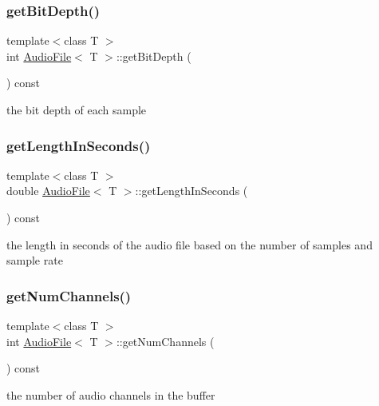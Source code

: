 \subsubsection{\texorpdfstring{get\+Bit\+Depth()}{getBitDepth()}}
{\footnotesize\ttfamily template$<$class T $>$ \\
int \hyperlink{class_audio_file}{Audio\+File}$<$ T $>$\+::get\+Bit\+Depth (\begin{DoxyParamCaption}{ }\end{DoxyParamCaption}) const}

the bit depth of each sample \mbox{\label{class_audio_file_a5a6b01404675361b1c21c9c5fb5753d4}} 
\subsubsection{\texorpdfstring{get\+Length\+In\+Seconds()}{getLengthInSeconds()}}
{\footnotesize\ttfamily template$<$class T $>$ \\
double \hyperlink{class_audio_file}{Audio\+File}$<$ T $>$\+::get\+Length\+In\+Seconds (\begin{DoxyParamCaption}{ }\end{DoxyParamCaption}) const}

the length in seconds of the audio file based on the number of samples and sample rate \mbox{\label{class_audio_file_a514f860a956b4494ee8d8c806391d6b3}} 
\subsubsection{\texorpdfstring{get\+Num\+Channels()}{getNumChannels()}}
{\footnotesize\ttfamily template$<$class T $>$ \\
int \hyperlink{class_audio_file}{Audio\+File}$<$ T $>$\+::get\+Num\+Channels (\begin{DoxyParamCaption}{ }\end{DoxyParamCaption}) const}

the number of audio channels in the buffer \mbox{\label{class_audio_file_ae1b5b4b7351a79dbf810bb34ede496b9}} 
